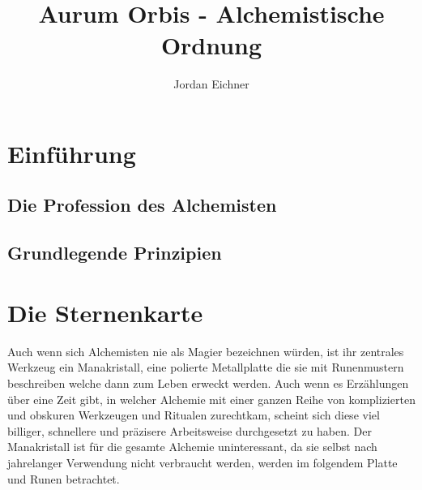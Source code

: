 \documentclass[a4paper,12pt,oneside]{book}
\title{Aurum Orbis - Alchemistische Ordnung}
\author{Jordan Eichner}
\date{}
\begin{document}
\maketitle
\tableofcontents

\part{Einführung}

\chapter{Die Profession des Alchemisten}

\chapter{Grundlegende Prinzipien}



\part{Die Sternenkarte}
Auch wenn sich Alchemisten nie als Magier bezeichnen würden, ist ihr zentrales Werkzeug ein Manakristall, eine polierte Metallplatte die sie mit Runenmustern beschreiben welche dann zum Leben erweckt werden. Auch wenn es Erzählungen über eine Zeit gibt, in welcher Alchemie mit einer ganzen Reihe von komplizierten und obskuren Werkzeugen und Ritualen zurechtkam, scheint sich diese viel billiger, schnellere und präzisere Arbeitsweise durchgesetzt zu haben. Der Manakristall ist für die gesamte Alchemie uninteressant, da sie selbst nach jahrelanger Verwendung nicht verbraucht werden, werden im folgendem Platte und Runen betrachtet.
\end{document}
